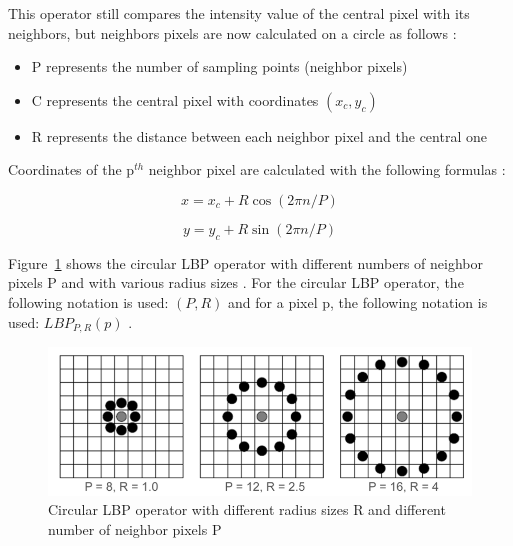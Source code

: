 \noindent This operator still compares the intensity value of the central pixel with its neighbors, but neighbors pixels are now calculated on a circle as follows \cite{GAN08}:

\begin{itemize}
  \item P represents the number of sampling points (neighbor pixels)
  \item C represents the central pixel with coordinates $ (x_c,y_c) $
  \item R represents the distance between each neighbor pixel and the central one
\end{itemize}

\noindent Coordinates of the p$^{th}$ neighbor pixel are calculated with the following formulas \cite{JUL07}:
\newline

\begin{equation}
   x = x_c + R\cos(2\pi n/P)
\end{equation}

\begin{equation}
   y = y_c + R\sin(2\pi n/P)
\end{equation}

\vspace{\baselineskip}
\noindent Figure~\ref{lbp_circular_operator} shows the circular LBP operator with different numbers of neighbor pixels P and with various radius sizes \cite{JUL07}. For the circular LBP operator, the following notation is used: $ (P,R) $ and for a pixel p, the following notation is used: $ LBP_{P,R}(p) $ \cite{GAN08}.
\newline

\begin{figure}[!h]
\begin{center}
\noindent \includegraphics[scale=0.5]{figures/lbp_circular_operator} 
\newline
\caption{Circular LBP operator with different radius sizes R and different number of neighbor pixels P}
\label{lbp_circular_operator}
\end{center} 
\end{figure}

